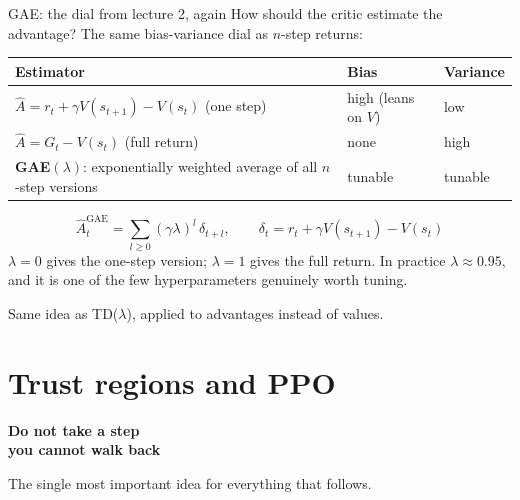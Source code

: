 \documentclass[aspectratio=169]{beamer}
\begin{document}
\begin{frame}{GAE: the dial from lecture 2, again}
  \small
  How should the critic estimate the advantage? The same bias-variance dial as $n$-step returns:

  \vskip 6pt
  \begin{center}
  \footnotesize
  \begin{tabular}{l l l}
    \toprule
    \textbf{Estimator} & \textbf{Bias} & \textbf{Variance} \\
    \midrule
    $\hat{A} = r_t + \gamma V(s_{t+1}) - V(s_t)$ \; (one step) & high (leans on $V$) & low \\
    $\hat{A} = G_t - V(s_t)$ \; (full return) & none & high \\
    \textbf{GAE}$(\lambda)$: exponentially weighted average of all $n$-step versions & tunable & tunable \\
    \bottomrule
  \end{tabular}
  \end{center}

  \vskip 8pt
  \begin{tcolorbox}[colback=armblue!8, colframe=armblue, boxrule=0.6pt, arc=2pt,
                    title={\textbf{Generalised Advantage Estimation} (Schulman et al., 2015)}]
    \small
    \[ \hat{A}^{\text{GAE}}_t = \sum_{l \ge 0} (\gamma\lambda)^l\, \delta_{t+l},
       \qquad \delta_t = r_t + \gamma V(s_{t+1}) - V(s_t) \]
    \vskip 2pt
    $\lambda = 0$ gives the one-step version; $\lambda = 1$ gives the full return. In practice
    $\lambda \approx 0.95$, and it is one of the few hyperparameters genuinely worth tuning.
  \end{tcolorbox}

  \vskip 4pt
  \begin{center}
    \small
    Same idea as TD($\lambda$), applied to advantages instead of values.
  \end{center}
\end{frame}

\section{Trust regions and PPO}
\begin{frame}[plain]
  \begin{center}
    \vskip 1.6cm
    {\Huge\bfseries\color{popblue}Do not take a step\\ you cannot walk back}

    \vskip 0.6cm
    {\large The single most important idea for everything that follows.}
  \end{center}
\end{frame}
\end{document}
